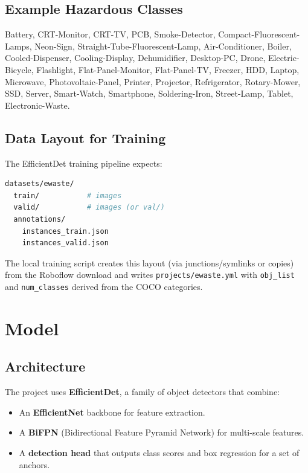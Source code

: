 \documentclass[11pt,a4paper]{article}
\begin{document}
\subsection{Example Hazardous Classes}

Battery, CRT-Monitor, CRT-TV, PCB, Smoke-Detector, Compact-Fluorescent-Lamps, Neon-Sign, Straight-Tube-Fluorescent-Lamp, Air-Conditioner, Boiler, Cooled-Dispenser, Cooling-Display, Dehumidifier, Desktop-PC, Drone, Electric-Bicycle, Flashlight, Flat-Panel-Monitor, Flat-Panel-TV, Freezer, HDD, Laptop, Microwave, Photovoltaic-Panel, Printer, Projector, Refrigerator, Rotary-Mower, SSD, Server, Smart-Watch, Smartphone, Soldering-Iron, Street-Lamp, Tablet, Electronic-Waste.

\subsection{Data Layout for Training}

The EfficientDet training pipeline expects:

\begin{lstlisting}[language=bash, caption={Expected dataset layout.}]
datasets/ewaste/
  train/           # images
  valid/           # images (or val/)
  annotations/
    instances_train.json
    instances_valid.json
\end{lstlisting}

The local training script creates this layout (via junctions/symlinks or copies) from the Roboflow download and writes \texttt{projects/ewaste.yml} with \texttt{obj\_list} and \texttt{num\_classes} derived from the COCO categories.

\section{Model}
\label{sec:model}

\subsection{Architecture}

The project uses \textbf{EfficientDet}, a family of object detectors that combine:

\begin{itemize}[noitemsep]
    \item An \textbf{EfficientNet} backbone for feature extraction.
    \item A \textbf{BiFPN} (Bidirectional Feature Pyramid Network) for multi-scale features.
    \item A \textbf{detection head} that outputs class scores and box regression for a set of anchors.
\end{itemize}
\end{document}
